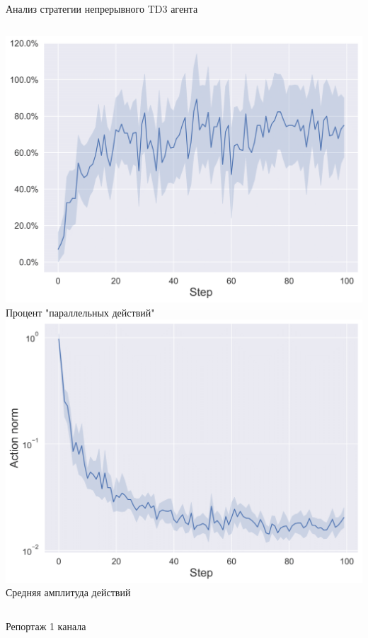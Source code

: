 \begin{frame}{Анализ стратегии непрерывного TD3 агента}
\begin{columns}
\centering
\includegraphics[width=1\linewidth]{Presentation/images/parallel_actions.png}
Процент "параллельных действий"
\centering
\includegraphics[width=1\linewidth]{Presentation/images/action_norm_decrease.png}
Средняя амплитуда действий
\end{columns}
\end{frame}

\begin{frame}{Репортаж 1 канала}
    
\end{frame}


